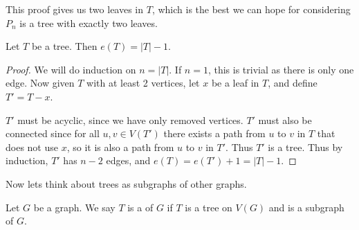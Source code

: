 \begin{remark}
	This proof gives us two leaves in $T$, which is the best we can hope for considering $P_n$ is a tree with exactly two leaves.
\end{remark}

\begin{proposition}
	Let $T$ be a tree. Then $e(T) = |T| - 1$.
\end{proposition}
\begin{proof}
	We will do induction on $n = |T|$. If $n = 1$, this is trivial as there is only one edge. Now given $T$ with at least 2 vertices, let $x$ be a leaf in $T$, and define $T' = T - x$.
	
	$T'$ must be acyclic, since we have only removed vertices. $T'$ must also be connected since for all $u, v \in V(T')$ there exists a path from $u$ to $v$ in $T$ that does not use $x$, so it is also a path from $u$ to $v$ in $T'$. Thus $T'$ is a tree.
	Thus by induction, $T'$ has $n - 2$ edges, and $e(T) = e(T') + 1 = |T| - 1$. 
\end{proof}

Now lets think about trees as subgraphs of other graphs.

\begin{definition}
	Let $G$ be a graph. We say $T$ is a  of $G$ if $T$ is a tree on $V(G)$ and is a subgraph of $G$.
\end{definition}

